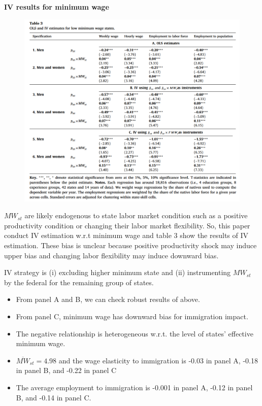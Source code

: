 \documentclass[../root]{subfiles}
\begin{document}
    {\bf IV results for minimum wage}
    \begin{figure}[h]
        \includegraphics[width=12cm]{0612sugiyama/Table3.png}
    \end{figure}

    $MW_{st}$ are likely endogenous to state labor market condition such as a positive productivity condition or changing their labor market flexibility. So, this paper conduct IV estimation w.r.t minimum wage and table 3 show the results of IV estimation.
    These bias is unclear because positive productivity shock may induce upper bias and changing labor flexibility may induce downward bias.
    
    IV strategy is (i) excluding higher minimum state and (ii) instrumenting $MW_{st}$ by the federal for the remaining group of states.
    
    \begin{itemize}
        \item From panel A and B, we can check robust results of above.
        \item From panel C, minimum wage has downward bias for immigration impact.
        \item The negative relationship is heterogeneous w.r.t. the level of states' effective minimum wage.
        \item $\overline{MW}_{st}=4.98$ and the wage elasticity to immigration is -0.03 in panel A, -0.18 in panel B, and -0.22 in panel C
        \item The average employment to immigration is -0.001 in panel A, -0.12 in panel B, and -0.14 in panel C.   
    \end{itemize}
\end{document}
